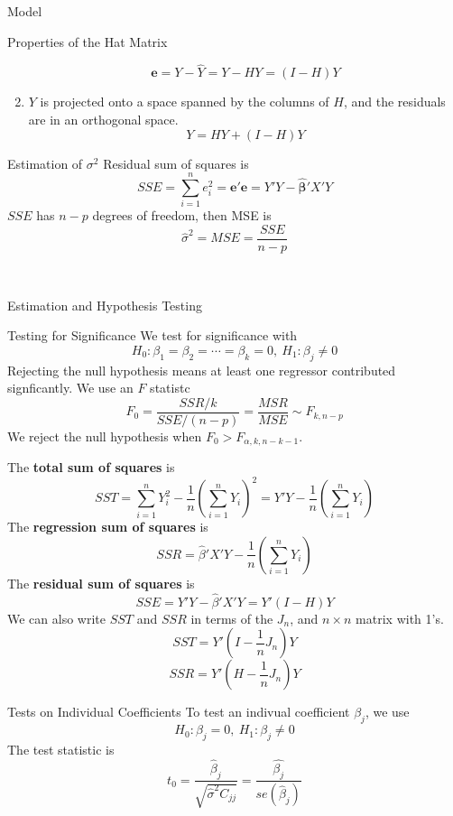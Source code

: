 \documentclass{article}
\begin{document}
\begin{multicols*}{3}
\begin{blackbox}{Model}
\begin{bluebox}{Properties of the Hat Matrix}
\begin{enumerate}[label=(\alph*)]
                \[\boldsymbol{e} = Y - \hat{Y} = Y - HY = (I-H)Y\]
                \item $Y$ is projected onto a space spanned by the columns of $H$, and the residuals are in an orthogonal space.\\[-2ex]
                \[Y = HY + (I-H)Y\]
            \end{enumerate}
        \end{bluebox}
        \begin{redbox}{Estimation of $\sigma^2$}
            Residual sum of squares is \\[-2ex]
            \[SSE = \sum_{i=1}^n e_i^2 = \boldsymbol{e'e} = Y'Y - \boldsymbol{\hat{\beta}}'X'Y\]
            $SSE$ has $n-p$ degrees of freedom, then MSE is 
            \[\hat{\sigma}^2 = MSE = \frac{SSE}{n-p}\]
        \end{redbox}\\[-2ex]
    \end{blackbox}
    \begin{blackbox}{Estimation and Hypothesis Testing}
        \begin{brownbox}{Testing for Significance}
            We test for significance with 
            \[H_0: \beta_1 = \beta_2 = \cdots = \beta_k = 0, \ H_1: \beta_j \neq 0\]
            Rejecting the null hypothesis means at least one regressor contributed signficantly. We use an $F$ statistc 
            \[F_0 = \frac{SSR/k}{SSE/(n-p)} = \frac{MSR}{MSE} \sim F_{k, n-p}\]
            We reject the null hypothesis when $F_0 > F_{\alpha, k,n-k-1}$.
        \end{brownbox}
        The \textbf{total sum of squares} is 
        \[SST = \sum_{i=1}^n Y_i^2 -  \frac{1}{n}\left(\sum_{i=1}^n Y_i\right)^2 = Y'Y - \frac{1}{n}\left(\sum_{i=1}^n Y_i\right)\]
        The \textbf{regression sum of squares} is 
        \[SSR = \hat{\beta}'X'Y -\frac{1}{n}\left(\sum_{i=1}^n Y_i\right)\]
        The \textbf{residual sum of squares} is 
        \[SSE = Y'Y - \hat{\beta}'X'Y = Y'(I - H)Y\]
        We can also write $SST$ and $SSR$ in terms of the $J_n$, and $n\times n$ matrix with 1's.
        \[SST = Y' \left(I - \frac{1}{n}J_n\right)Y\]
        \[SSR = Y'\left(H - \frac{1}{n}J_n\right)Y\]
        \begin{bluebox}{Tests on Individual Coefficients}
            To test an indivual coefficient $\beta_j$, we use
            \[H_0: \beta_j = 0, \ H_1: \beta_j \neq 0\]
            The test statistic is \\[-1ex]
            \[t_0 = \frac{\hat{\beta}_j}{\sqrt{\hat{\sigma}^2C_{jj}}} = \frac{\hat{\beta_j}}{se(\hat{\beta}_j)}\]

\end{bluebox}
\end{blackbox}
\end{multicols*}
\end{document}

